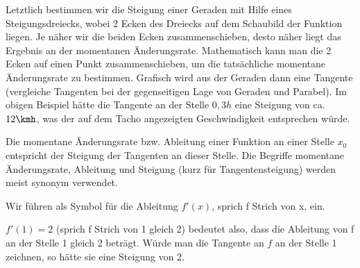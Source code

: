 Letztlich bestimmen wir die Steigung einer Geraden mit Hilfe eines Steigungsdreiecks, wobei 2 Ecken des Dreiecks auf dem Schaubild der Funktion liegen. Je näher wir die beiden Ecken zusammenschieben, desto näher liegt das Ergebnis an der momentanen Änderungsrate. Mathematisch kann man die 2 Ecken auf einen Punkt zusammenschieben, um die tatsächliche momentane Änderungsrate zu bestimmen. Grafisch wird aus der Geraden dann eine Tangente (vergleiche Tangenten bei der gegenseitigen Lage von Geraden und Parabel). Im obigen Beispiel hätte die Tangente an der Stelle \(0,3h\) eine Steigung von ca. \(12\kmh\), was der auf dem Tacho angezeigten Geschwindigkeit entsprechen würde.\newpage
\begin{tcolorbox}

    \bigskip

	\textcolor{loestc}{Die momentane Änderungsrate bzw. Ableitung einer Funktion an einer Stelle \(x_0\) entspricht der Steigung der Tangenten an dieser Stelle. Die Begriffe momentane Änderungsrate, Ableitung und Steigung (kurz für Tangentensteigung) werden meist synonym verwendet.}

    \bigskip

\end{tcolorbox}
\begin{minipage}{\textwidth}
\end{minipage}
\begin{tcolorbox}

    \bigskip

	\textcolor{loestc}{Wir führen als Symbol für die Ableitung \(f'(x)\), sprich f Strich von x, ein.}

	\textcolor{loestc}{\(f'(1)=2\) (sprich f Strich von 1 gleich 2) bedeutet also, dass die Ableitung von f an der Stelle 1 gleich 2 beträgt. Würde man die Tangente an \(f\) an der Stelle 1 zeichnen, so hätte sie eine Steigung von 2.}

    \bigskip

\end{tcolorbox}
